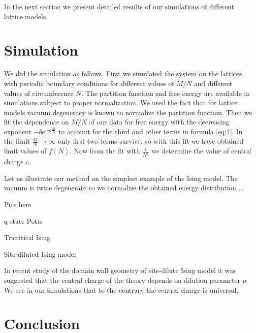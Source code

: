 \documentclass[aps,prl,reprint]{revtex4-1}
\begin{document}
In the next section we present detailed results of our simulations of different lattice models. 

\section{Simulation}
\label{sec:simulation}

We did the
simulation as follows. First we simulated the system on the lattices with periodic boundary
conditions for different values of $M/N$ and different values of circumference $N$. The partition
function and free energy are available in simulations subject to proper normalization. We used the
fact that for lattice models vacuum degeneracy is known to normalize the partition function. Then we
fit the dependence on $M/N$ of our data for free energy with the decreasing exponent $-b e^{-a
  \frac{M}{N}}$ to account for the third and other terms in formula \eqref{eq:7}. In the limit
$\frac{M}{N}\to\infty$ only first two terms survive, so with this fit we have obtained limit values
of $f(N)$. Now from the fit with $\frac{1}{N^{2}}$ we determine the value of central charge $c$. 

Let us illustrate our method on the simplest example of the Ising model. The vacuum is twice
degenerate so we normalize the obtained energy distribution  ... 

Pics here

q-state Potts

Tricritical Ising

Site-diluted Ising model

In recent study \cite{najafi2016monte} of the domain wall geometry of site-dilute Ising model it was
suggested that the central charge of the theory depends on dilution parameter $p$. We see in our
simulations that to the contrary the central charge is universal. 


\section*{Conclusion}
\label{sec:conclusion}


{} 

\end{document}
